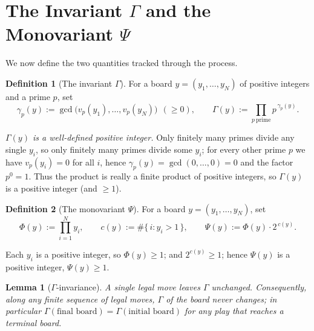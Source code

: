 \documentclass[11pt]{article}
\theoremstyle{plain}
\newtheorem{lemma}{Lemma}
\theoremstyle{definition}
\newtheorem{definition}{Definition}
\theoremstyle{remark}
\begin{document}
\section{The Invariant $\Gamma$ and the Monovariant $\Psi$}

We now define the two quantities tracked through the process.

\begin{definition}[The invariant $\Gamma$]\label{def:Gamma}
For a board $y=(y_1,\dots,y_N)$ of positive integers and a prime $p$, set
\[
\gamma_p(y):=\gcd\bigl(v_p(y_1),\dots,v_p(y_N)\bigr)\ \ (\ge 0),
\qquad
\Gamma(y):=\prod_{p\ \text{prime}} p^{\,\gamma_p(y)}.
\]
\end{definition}

\noindent\emph{$\Gamma(y)$ is a well-defined positive integer.} Only finitely
many primes divide any single $y_i$, so only finitely many primes divide some
$y_i$; for every other prime $p$ we have $v_p(y_i)=0$ for all $i$, hence
$\gamma_p(y)=\gcd(0,\dots,0)=0$ and the factor $p^{0}=1$. Thus the product is
really a finite product of positive integers, so $\Gamma(y)$ is a positive
integer (and $\ge 1$).

\begin{definition}[The monovariant $\Psi$]\label{def:Psi}
For a board $y=(y_1,\dots,y_N)$, set
\[
\Phi(y):=\prod_{i=1}^N y_i,\qquad
c(y):=\#\{\,i: y_i>1\,\},\qquad
\Psi(y):=\Phi(y)\cdot 2^{\,c(y)}.
\]
\end{definition}

\noindent Each $y_i$ is a positive integer, so $\Phi(y)\ge 1$; and
$2^{c(y)}\ge 1$; hence $\Psi(y)$ is a positive integer, $\Psi(y)\ge 1$.

\begin{lemma}[$\Gamma$-invariance]\label{lem:G}
A single legal move leaves $\Gamma$ unchanged. Consequently, along any finite
sequence of legal moves, $\Gamma$ of the board never changes; in particular
$\Gamma(\text{final board})=\Gamma(\text{initial board})$ for any play that
reaches a terminal board.
\end{lemma}
\end{document}
